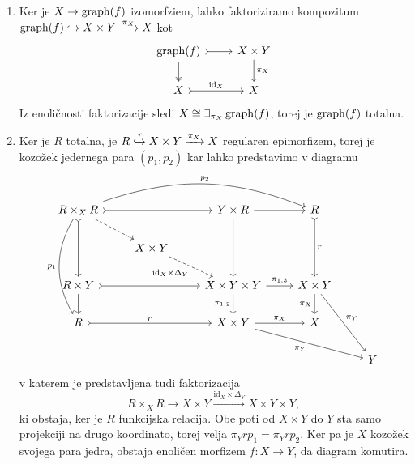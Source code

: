 \documentclass[../kategoricna_logika.tex]{subfiles}
\begin{document}
\begin{dokaz}
\begin{enumerate}[label=(\roman*)]
  \item Ker je $X \to \operatorname{graph}(f)$ izomorfziem, lahko faktoriziramo kompozitum
    $\operatorname{graph}(f) \hookrightarrow X \times Y \xrightarrow{\pi_X} X$ kot
    \begin{equation*}
    \begin{tikzcd}
      \operatorname{graph}(f) \ar[d, two heads] \ar[r, tail]  & X \times Y \ar[d, "\pi_X"] \\
      X \ar[r, tail, "\mathrm{id}_X"] & X
    \end{tikzcd}
    \end{equation*}
    Iz enoličnosti faktorizacije sledi $X \cong \exists_{\pi_X}\operatorname{graph}(f)$, torej je $\operatorname{graph}(f)$ totalna.

  \item Ker je $R$ totalna, je $R \xhookrightarrow{r} X \times Y \xrightarrow{\pi_X} X$ regularen epimorfizem,
    torej je kozožek jedernega para $(p_1, p_2)$ kar lahko predstavimo v diagramu
    \begin{equation*}
    \begin{tikzcd}[column sep=normal]
      R \times_X R \ar[ddd, bend right=30, "p_1"'] \ar[dd, tail] \ar[dr, dashed] \ar[rr, tail] \ar[rrr, bend left=20, "p_2"] & &  Y \times R \ar[dd] \ar[r] & R \ar[dd, tail, "r"] & \\
      & X \times Y \ar[dr, dashed, "\mathrm{id}_X \times \Delta_Y"'] & & & \\
      R \times Y \ar[d] \ar[rr, tail] & & X \times Y \times Y  \ar[d, "\pi_{1,2}"'] \ar[r, "\pi_{1,3}"] & X\times Y \ar[d, "\pi_X"'] \ar[ddr, "\pi_Y"] & \\
      R \ar[rr, tail, "r"] & & X \times Y \ar[r, "\pi_X"] \ar[drr, "\pi_Y"'] & X & \\
      & & & & Y
    \end{tikzcd}
    \end{equation*}
    v katerem je predstavljena tudi faktorizacija 
    $$R \times_X R \to X \times Y \xrightarrow{\mathrm{id}_X \times \Delta_Y} X \times Y \times Y,$$
    ki obstaja, ker je $R$ funkcijska relacija.
    Obe poti od $X \times Y$ do $Y$ sta samo projekciji na drugo koordinato, torej velja $\pi_Y r p_1 = \pi_Y r p_2$.
    Ker pa je $X$ kozožek svojega para jedra, obstaja enoličen morfizem $f : X \to Y$, da diagram komutira.


\end{enumerate}
\end{dokaz}
\end{document}
